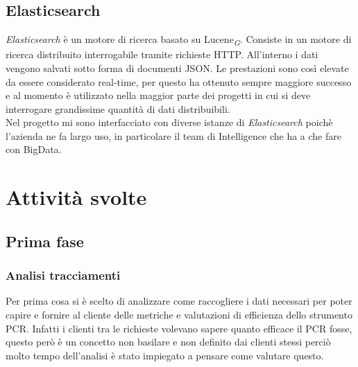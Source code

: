\documentclass[a4paper, 12pt, twoside, openright]{book}
\newcommand{\gloss}[1]{#1\textsubscript{\textit{\tiny{G}}}}
\begin{document}
\subsection{Elasticsearch}
\textit{Elasticsearch} è un motore di ricerca basato su \gloss{Lucene}. Consiste in un motore di ricerca distribuito interrogabile tramite richieste HTTP. All'interno i dati vengono salvati sotto forma di documenti JSON. Le prestazioni sono così elevate da essere considerato real-time, per questo ha ottenuto sempre maggiore successo e al momento è utilizzato nella maggior parte dei progetti in cui si deve interrogare grandissime quantità di dati distribuibili.\\
Nel progetto mi sono interfacciato con diverse istanze di \textit{Elasticsearch} poichè l'azienda ne fa largo uso, in particolare il team di Intelligence che ha a che fare con BigData.

\newpage{}
\section{Attività svolte}

\subsection{Prima fase}

\subsubsection{Analisi tracciamenti}
\label{analisi-pcr}
Per prima cosa si è scelto di analizzare come raccogliere i dati necessari per poter capire e fornire al cliente delle metriche e valutazioni di efficienza dello strumento PCR. Infatti i clienti tra le richieste volevano sapere quanto efficace il PCR fosse, questo però è un concetto non basilare e non definito dai clienti stessi perciò molto tempo dell'analisi è stato impiegato a pensare come valutare questo.\\
\end{document}
